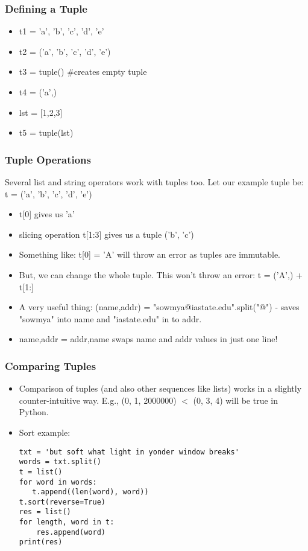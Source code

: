 \documentclass{beamer}
\begin{document}
\begin{frame}[fragile]
\frametitle{Defining a Tuple}
\begin{itemize}
\item t1 = 'a', 'b', 'c', 'd', 'e'
\item t2 = ('a', 'b', 'c', 'd', 'e')
\item t3 = tuple() \#creates empty tuple
\item t4 = ('a',)
\item lst = [1,2,3]
\item t5 = tuple(lst)
\end{itemize}
\end{frame}

\begin{frame}[fragile]
\frametitle{Tuple Operations}
Several list and string operators work with tuples too. Let our example tuple be: t = ('a', 'b', 'c', 'd', 'e')
\begin{itemize}
\item t[0] gives us 'a'
\item slicing operation t[1:3] gives us a tuple ('b', 'c')
\item Something like: t[0] = 'A' will throw an error as tuples are immutable.
\item But, we can change the whole tuple. This won't throw an error: t = ('A',) + t[1:]
\item A very useful thing: (name,addr) = "sowmya@iastate.edu".split("@") - saves "sowmya" into name and "iastate.edu" in to addr.
\item name,addr = addr,name swaps name and addr values in just one line!
\end{itemize}
\end{frame}

\begin{frame}[fragile] %
\frametitle{Comparing Tuples}
\begin{itemize}
\item Comparison of tuples (and also other sequences like lists) works in a slightly counter-intuitive way. E.g., (0, 1, 2000000) $<$ (0, 3, 4) will be true in Python. \pause
\item Sort example:
\begin{verbatim}
txt = 'but soft what light in yonder window breaks'
words = txt.split()
t = list()
for word in words:
   t.append((len(word), word))
t.sort(reverse=True)
res = list()
for length, word in t:
    res.append(word)
print(res)
\end{verbatim}
\end{itemize}
\end{frame}
\end{document}
